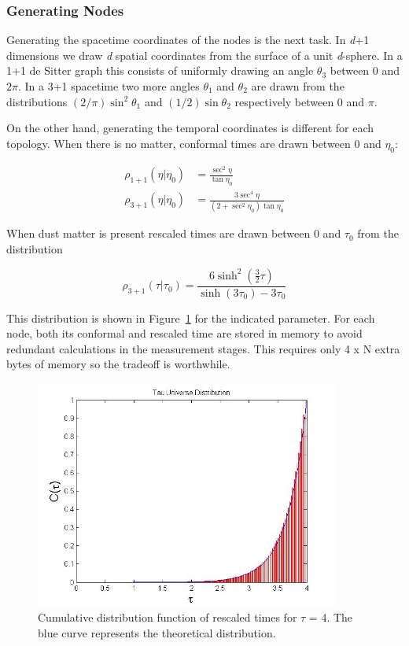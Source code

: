 \documentclass[preprint,notitlepage,amsmath,amssymb,floatfix]{revtex4-1}
\begin{document}
\subsubsection{Generating Nodes}
Generating the spacetime coordinates of the nodes is the next task.  
In \textit{d}+1 dimensions we draw \textit{d} spatial coordinates from the surface of a unit \textit{d}-sphere.  
In a 1+1 de Sitter graph this consists of uniformly drawing an angle $\theta_3$ between 0 and $2\pi$.  
In a 3+1 spacetime two more angles $\theta_1$ and $\theta_2$ are drawn from the distributions $\left(2/\pi\right)\sin^2\theta_1$ and $\left(1/2\right)\sin\theta_2$ respectively between 0 and $\pi$. \par
On the other hand, generating the temporal coordinates is different for each topology.
When there is no matter, conformal times are drawn between 0 and $\eta_0$:

\begin{align}
\rho_{1+1}\left(\eta|\eta_0\right) &= \frac{\sec^2\eta}{\tan\eta_0} \\
\rho_{3+1}\left(\eta|\eta_0\right) &= \frac{3\sec^4\eta}{\left(2+\sec^2\eta_0\right)\tan\eta_0}
\end{align}

\noindent When dust matter is present rescaled times are drawn between 0 and $\tau_0$ from the distribution

\begin{equation}
\label{eq:rhotau3}
\rho_{3+1}\left(\tau|\tau_0\right) = \frac{6\sinh^2\left(\frac{3}{2}\tau\right)}{\sinh\left(3\tau_0\right) - 3\tau_0}
\end{equation}

\noindent This distribution is shown in Figure~\ref{fig:tau_cdf} for the indicated parameter.
For each node, both its conformal and rescaled time are stored in memory to avoid redundant calculations in the measurement stages.
This requires only 4 x N extra bytes of memory so the tradeoff is worthwhile.

\begin{figure}
\includegraphics[width=10cm]{figures/tau_dist.jpg}
\caption{Cumulative distribution function of rescaled times for $\tau$ = 4.  The blue curve represents the theoretical distribution.}
\label{fig:tau_cdf}
\centering
\end{figure}
\end{document}
